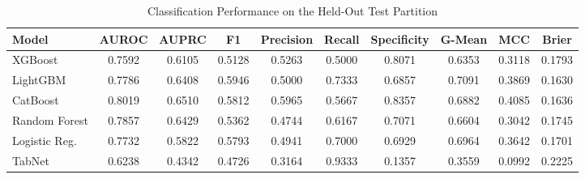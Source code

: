 \begin{table}
\centering
\caption{Classification Performance on the Held-Out Test Partition}
\label{tab:results}
\begin{tabular}{lccccccccc}
\toprule
Model & AUROC & AUPRC & F1 & Precision & Recall & Specificity & G-Mean & MCC & Brier \\
\midrule
XGBoost & 0.7592 & 0.6105 & 0.5128 & 0.5263 & 0.5000 & 0.8071 & 0.6353 & 0.3118 & 0.1793 \\
LightGBM & 0.7786 & 0.6408 & 0.5946 & 0.5000 & 0.7333 & 0.6857 & 0.7091 & 0.3869 & 0.1630 \\
CatBoost & 0.8019 & 0.6510 & 0.5812 & 0.5965 & 0.5667 & 0.8357 & 0.6882 & 0.4085 & 0.1636 \\
Random Forest & 0.7857 & 0.6429 & 0.5362 & 0.4744 & 0.6167 & 0.7071 & 0.6604 & 0.3042 & 0.1745 \\
Logistic Reg. & 0.7732 & 0.5822 & 0.5793 & 0.4941 & 0.7000 & 0.6929 & 0.6964 & 0.3642 & 0.1701 \\
TabNet & 0.6238 & 0.4342 & 0.4726 & 0.3164 & 0.9333 & 0.1357 & 0.3559 & 0.0992 & 0.2225 \\
\bottomrule
\end{tabular}
\end{table}
